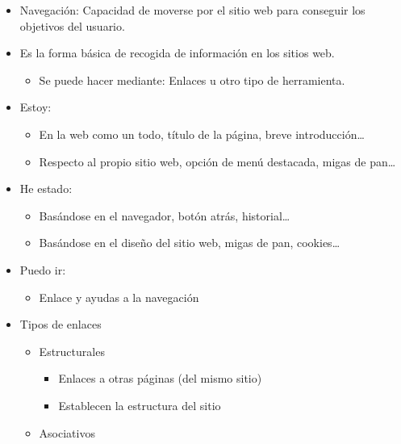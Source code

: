 \documentclass[12pt, twoside, openright]{report} %
\begin{document}
\begin{itemize}
    \item Navegación: Capacidad de moverse por el sitio web para conseguir
      los objetivos del usuario.
    \item Es la forma básica de recogida de información en los sitios web.
      \begin{itemize}
        \item Se puede hacer mediante: Enlaces u otro tipo de herramienta.
      \end{itemize}
      \pagebreak
    \item Estoy:
      \vspace{-0.5cm}
      \begin{itemize}
      
        \item
          En la web como un todo, título de la página, breve
          introducción\ldots{}
        \item
          Respecto al propio sitio web, opción de menú destacada, migas
          de pan\ldots{}
      \end{itemize}
    \item He estado:
      \vspace{-0.5cm}
      \begin{itemize}
      
        \item
          Basándose en el navegador, botón atrás, historial\ldots{}
        \item
          Basándose en el diseño del sitio web, migas de pan,
          cookies\ldots{}
      \end{itemize}
    \item Puedo ir:
      \vspace{-0.5cm}
      \begin{itemize}
      
        \item
          Enlace y ayudas a la navegación
      \end{itemize}
    \item Tipos de enlaces

      \begin{itemize}
      
        \item
          Estructurales

          \begin{itemize}
          
            \item
              Enlaces a otras páginas (del mismo sitio)
            \item
              Establecen la estructura del sitio
          \end{itemize}
        \item
          Asociativos


\end{itemize}
\end{itemize}
\end{document}
